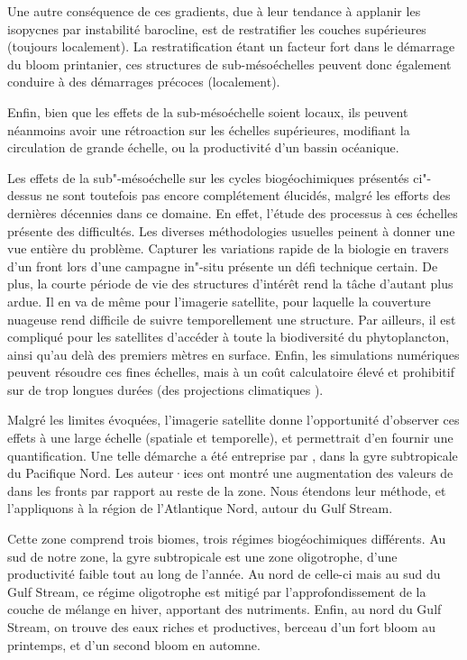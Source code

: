 Une autre conséquence de ces gradients, due à leur tendance à applanir les isopycnes par instabilité barocline, est de restratifier les couches supérieures (toujours localement).
La restratification étant un facteur fort dans le démarrage du bloom printanier, ces structures de sub-mésoéchelles peuvent donc également conduire à des démarrages précoces (localement).

Enfin, bien que les effets de la sub-mésoéchelle soient locaux, ils peuvent néanmoins avoir une rétroaction sur les échelles supérieures, modifiant la circulation de grande échelle, ou la productivité d'un bassin océanique.

Les effets de la sub"-mésoéchelle sur les cycles biogéochimiques présentés ci"-dessus ne sont toutefois pas encore complétement élucidés, malgré les efforts des dernières décennies dans ce domaine.
En effet, l'étude des processus à ces échelles présente des difficultés.
Les diverses méthodologies usuelles peinent à donner une vue entière du problème.
Capturer les variations rapide de la biologie en travers d'un front lors d'une campagne in"-situ présente un défi technique certain.
De plus, la courte période de vie des structures d'intérêt rend la tâche d'autant plus ardue.
Il en va de même pour l'imagerie satellite, pour laquelle la couverture nuageuse rend difficile de suivre temporellement une structure.
Par ailleurs, il est compliqué pour les satellites d'accéder à toute la biodiversité du phytoplancton, ainsi qu'au delà des premiers mètres en surface.
Enfin, les simulations numériques peuvent résoudre ces fines échelles, mais à un coût calculatoire élevé et prohibitif sur de trop longues durées (des projections climatiques ).

Malgré les limites évoquées, l'imagerie satellite donne l'opportunité d'observer ces effets à une large échelle (spatiale et temporelle), et permettrait d'en fournir une quantification.
Une telle démarche a été entreprise par \textcite{liu_2016}, dans la gyre subtropicale du Pacifique Nord.
Les auteur·ices  ont montré une augmentation des valeurs de  dans les fronts par rapport au reste de la zone.
Nous étendons leur méthode, et l'appliquons à la région de l'Atlantique Nord, autour du Gulf Stream.

Cette zone comprend trois biomes,  trois régimes biogéochimiques différents.
Au sud de notre zone, la gyre subtropicale est une zone oligotrophe, d'une productivité faible tout au long de l'année.
Au nord de celle-ci mais au sud du Gulf Stream, ce régime oligotrophe est mitigé par l'approfondissement de la couche de mélange en hiver, apportant des nutriments.
Enfin, au nord du Gulf Stream, on trouve des eaux riches et productives, berceau d'un fort bloom au printemps, et d'un second bloom en automne.

